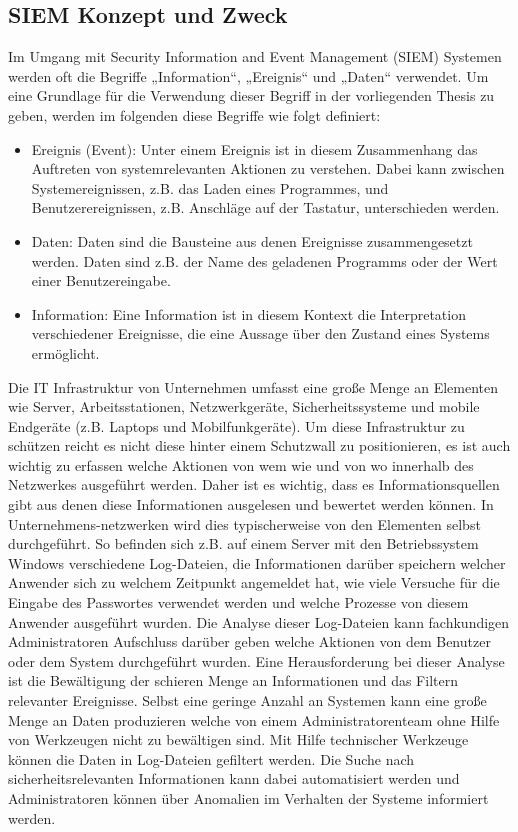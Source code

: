 \subsection{SIEM Konzept und Zweck}
\label{cha::SIEM Konzept und Zweck}
Im Umgang mit Security Information and Event Management (SIEM) Systemen werden oft die Begriffe „Information“, „Ereignis“ und „Daten“ verwendet. Um eine Grundlage für die Verwendung dieser Begriff in der vorliegenden Thesis zu geben, werden im folgenden diese Begriffe wie folgt definiert:
\begin{itemize}
\item Ereignis (Event): Unter einem Ereignis ist in diesem Zusammenhang das Auftreten von systemrelevanten Aktionen zu verstehen. Dabei kann zwischen Systemereignissen, z.B. das Laden eines Programmes, und Benutzerereignissen, z.B. Anschläge auf der Tastatur, unterschieden werden. 
\item Daten: Daten sind die Bausteine aus denen Ereignisse zusammengesetzt werden. Daten sind z.B. der Name des geladenen Programms oder der Wert einer Benutzereingabe.
\item Information: Eine Information ist in diesem Kontext die Interpretation verschiedener Ereignisse, die eine Aussage über den Zustand eines Systems ermöglicht.
\end{itemize}


Die IT Infrastruktur von Unternehmen umfasst eine große Menge an Elementen wie Server, Arbeitsstationen, Netzwerkgeräte, Sicherheitssysteme und mobile Endgeräte (z.B. Laptops und Mobilfunkgeräte). Um diese Infrastruktur zu schützen reicht es nicht diese hinter einem Schutzwall zu positionieren, es ist auch wichtig zu erfassen welche Aktionen von wem wie und von wo innerhalb des Netzwerkes ausgeführt werden. Daher ist es wichtig, dass es Informationsquellen gibt aus denen diese Informationen ausgelesen und bewertet werden können. In Unternehmens-netzwerken wird dies typischerweise von den Elementen selbst durchgeführt. So befinden sich z.B. auf einem Server mit den Betriebssystem Windows verschiedene Log-Dateien, die Informationen darüber speichern welcher Anwender sich zu welchem Zeitpunkt angemeldet hat, wie viele Versuche für die Eingabe des Passwortes verwendet werden und welche Prozesse von diesem Anwender ausgeführt wurden. 
Die Analyse dieser Log-Dateien kann fachkundigen Administratoren Aufschluss darüber geben welche Aktionen von dem Benutzer oder dem System durchgeführt wurden. Eine Herausforderung bei dieser Analyse ist die Bewältigung der schieren Menge an Informationen und das Filtern relevanter Ereignisse. Selbst eine geringe Anzahl an Systemen kann eine große Menge an Daten produzieren welche von einem Administratorenteam ohne Hilfe von Werkzeugen nicht zu bewältigen sind. Mit Hilfe technischer Werkzeuge können die Daten in Log-Dateien gefiltert werden. Die Suche nach sicherheitsrelevanten Informationen kann dabei automatisiert werden und Administratoren können über Anomalien im Verhalten der Systeme informiert werden. 

